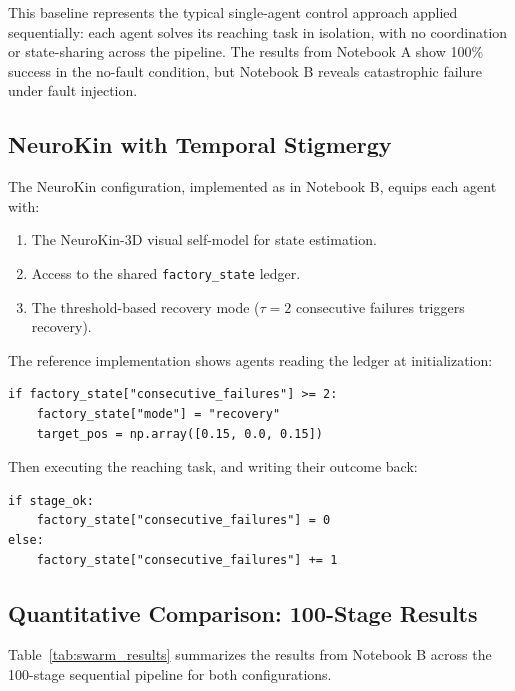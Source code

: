 \documentclass[12pt,a4paper,oneside]{report}
\begin{document}
This baseline represents the typical single-agent control approach applied sequentially: each agent solves its reaching task in isolation, with no coordination or state-sharing across the pipeline. The results from Notebook A show 100\% success in the no-fault condition, but Notebook B reveals catastrophic failure under fault injection.

\subsection{NeuroKin with Temporal Stigmergy}

The NeuroKin configuration, implemented as  in Notebook B, equips each agent with:

\begin{enumerate}
    \item The NeuroKin-3D visual self-model for state estimation.
    \item Access to the shared \texttt{factory\_state} ledger.
    \item The threshold-based recovery mode ($\tau = 2$ consecutive failures triggers recovery).
\end{enumerate}

The reference implementation shows agents reading the ledger at initialization:

{\small
\begin{verbatim}
if factory_state["consecutive_failures"] >= 2:
    factory_state["mode"] = "recovery"
    target_pos = np.array([0.15, 0.0, 0.15])
\end{verbatim}
}

Then executing the reaching task, and writing their outcome back:

{\small
\begin{verbatim}
if stage_ok:
    factory_state["consecutive_failures"] = 0
else:
    factory_state["consecutive_failures"] += 1
\end{verbatim}
}

\subsection{Quantitative Comparison: 100-Stage Results}

Table~\ref{tab:swarm_results} summarizes the results from Notebook B across the 100-stage sequential pipeline for both configurations.
\end{document}
